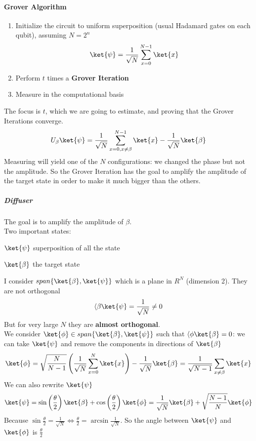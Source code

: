 \documentclass[10pt]{report}
\begin{document}
\paragraph{Grover Algorithm}
\begin{enumerate}
	\item Initialize the circuit to uniform superposition (usual Hadamard gates on each qubit), assuming $N=2^n$
	$$\ket{\psi}=\frac{1}{\sqrt{N}}\sum_{x=0}^{N-1}\ket{x}$$
	\item Perform $t$ times a \textbf{Grover Iteration}
	\item Measure in the computational basis
\end{enumerate}
The focus is $t$, which we are going to estimate, and proving that the Grover Iterations converge.
$$U_\beta\ket{\psi} = \frac{1}{\sqrt{N}}\sum_{x=0,x\neq\beta}^{N-1}\ket{x} - \frac{1}{\sqrt{N}}\ket{\beta}$$
Measuring will yield one of the $N$ configurations: we changed the phase but not the amplitude. So the Grover Iteration has the goal to amplify the amplitude of the target state in order to make it much bigger than the others.
\subparagraph{Diffuser} The goal is to amplify the amplitude of $\beta$.\\
Two important states:
\begin{list}{}{}
	\item $\ket{\psi}$ superposition of all the state
	\item $\ket{\beta}$ the target state
\end{list}
I consider $span\{\ket{\beta},\ket{\psi}\}$ which is a plane in $R^N$ (dimension 2). They are not orthogonal
$$\langle\beta\ket{\psi} = \frac{1}{\sqrt{N}}\neq 0$$
But for very large $N$ they are \textbf{almost orthogonal}.\\
We consider $\ket{\phi}\in span\{\ket{\beta},\ket{\psi}\}$ such that $\langle\phi\ket{\beta}=0$: we can take $\ket{\psi}$ and remove the components in directions of $\ket{\beta}$
$$\ket{\phi}=\sqrt{\frac{N}{N-1}}\left(\frac{1}{\sqrt{N}}\sum_{x=0}^N\ket{x}\right)-\frac{1}{\sqrt{N}}\ket{\beta} = \frac{1}{\sqrt{N-1}}\sum_{x\neq\beta}\ket{x}$$
We can also rewrite $\ket{\psi}$
$$\ket{\psi} = \sin\left(\frac{\theta}{2}\right)\ket{\beta} + \cos\left(\frac{\theta}{2}\right)\ket{\phi} = \frac{1}{\sqrt{N}}\ket{\beta} + \sqrt{\frac{N-1}{N}}\ket{\phi}$$
Because $\sin\frac{\theta}{2} = \frac{1}{\sqrt{N}}\Leftrightarrow\frac{\theta}{2}=\arcsin\frac{1}{\sqrt{N}}$. So the angle between $\ket{\psi}$ and $\ket{\phi}$ is $\frac{\theta}{2}$
\end{document}
